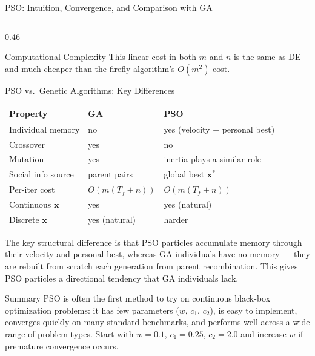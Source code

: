 \documentclass[aspectratio=169,10pt]{beamer}
\newcommand{\bx}{\mathbf{x}}
\begin{document}
\begin{frame}[allowframebreaks]{PSO: Intuition, Convergence, and Comparison with GA}
\begin{columns}[T]
\begin{column}{0.46\textwidth}
\begin{block}{Computational Complexity}
        This linear cost in both $m$ and $n$ is the same as DE and
        much cheaper than the firefly algorithm's $O(m^2)$ cost.
      \end{block}

      \begin{block}{PSO vs.\ Genetic Algorithms: Key Differences}
        \footnotesize
        \begin{tabular}{lll}
          \toprule
          Property & GA & PSO \\
          \midrule
          Individual memory & no & yes (velocity + personal best) \\
          Crossover & yes & no \\
          Mutation & yes & inertia plays a similar role \\
          Social info source & parent pairs & global best $\bx^*$ \\
          Per-iter cost & $O(m(T_f + n))$ & $O(m(T_f + n))$ \\
          Continuous $\bx$ & yes & yes (natural) \\
          Discrete $\bx$ & yes (natural) & harder \\
          \bottomrule
        \end{tabular}

        \vspace{4pt}
        The key structural difference is that PSO particles accumulate
        memory through their velocity and personal best, whereas GA
        individuals have no memory --- they are rebuilt from scratch
        each generation from parent recombination.  This gives PSO
        particles a directional tendency that GA individuals lack.
      \end{block}

      \begin{alertblock}{Summary}
        PSO is often the first method to try on continuous black-box
        optimization problems: it has few parameters ($w$, $c_1$,
        $c_2$), is easy to implement, converges quickly on many
        standard benchmarks, and performs well across a wide range
        of problem types.  Start with $w = 0.1$, $c_1 = 0.25$,
        $c_2 = 2.0$ and increase $w$ if premature convergence occurs.
      \end{alertblock}
    \end{column}
  \end{columns}

\end{frame}
\end{document}
